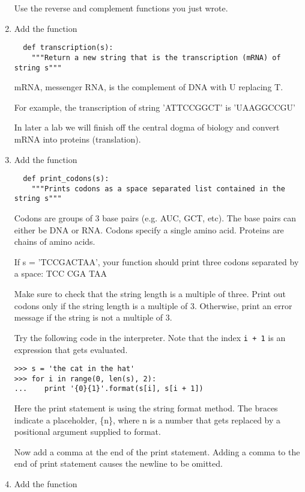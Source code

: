 \documentclass[12pt]{article}
\begin{document}
\begin{enumerate}[resume]
Use the reverse and complement functions you just wrote.

\item Add the function

\begin{verbatim}
  def transcription(s):
    """Return a new string that is the transcription (mRNA) of string s"""
\end{verbatim}

mRNA, messenger RNA, is the complement of DNA with U replacing T.

For example, the transcription of string 'ATTCCGGCT' is 'UAAGGCCGU'

In later a lab we will finish off the central dogma of biology and convert mRNA into proteins (translation). 

\item Add the function

\begin{verbatim}
  def print_codons(s):
    """Prints codons as a space separated list contained in the string s"""
\end{verbatim}

Codons are groups of 3 base pairs (e.g. AUC, GCT, etc). The base pairs can either be DNA or RNA. Codons specify a single amino acid. Proteins are chains of amino acids.

If s = 'TCCGACTAA', your function should print three codons separated by a space: TCC CGA TAA

Make sure to check that the string length is a multiple of three. Print out codons only if the string length is a multiple of 3. Otherwise, print an error message if the string is not a multiple of 3.

Try the following code in the interpreter. Note that the index \texttt{i + 1} is an expression that gets evaluated. 

\begin{verbatim}
>>> s = 'the cat in the hat'
>>> for i in range(0, len(s), 2):
...    print '{0}{1}'.format(s[i], s[i + 1])
\end{verbatim}

Here the print statement is using the string format method. The braces indicate a placeholder, \{n\}, where n is a number that gets replaced by a positional argument supplied to format. 

Now add a comma at the end of the print statement. Adding a comma to the end of print statement causes the newline to be omitted.

\item Add the function


\end{enumerate}
\end{document}
